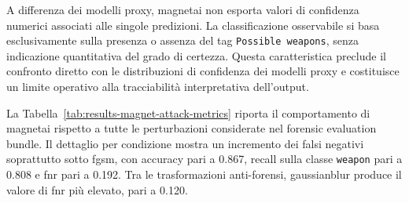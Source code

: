 A differenza dei modelli proxy, \gls{magnetai} non esporta valori di confidenza
numerici associati alle singole predizioni. La classificazione osservabile si
basa esclusivamente sulla presenza o assenza del tag \texttt{Possible weapons},
senza indicazione quantitativa del grado di certezza. Questa caratteristica
preclude il confronto diretto con le distribuzioni di confidenza dei modelli
proxy e costituisce un limite operativo alla tracciabilità interpretativa
dell'output.

La Tabella~\ref{tab:results-magnet-attack-metrics} riporta il comportamento di
\gls{magnetai} rispetto a tutte le perturbazioni considerate nel forensic
evaluation bundle. Il dettaglio per condizione mostra un incremento dei falsi negativi soprattutto
sotto \gls{fgsm}, con accuracy pari a 0.867, recall sulla classe
\texttt{weapon} pari a 0.808 e \gls{fnr} pari a 0.192. Tra le
trasformazioni anti-forensi, \gls{gaussianblur} produce il valore di \gls{fnr}
più elevato, pari a 0.120.

